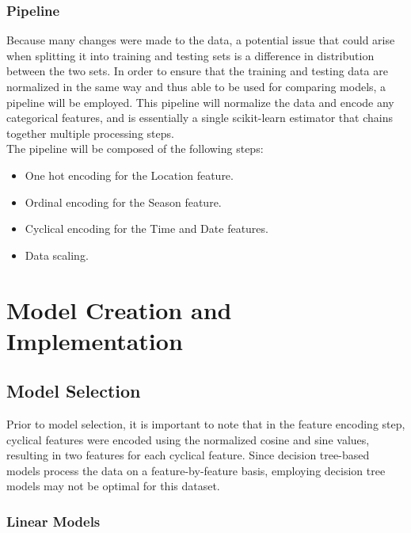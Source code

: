 \documentclass{report}
\begin{document}
\subsubsection{Pipeline}
Because many changes were made to the data, a potential issue that could arise when splitting it into training and testing sets is a difference in distribution between the two sets. In order to ensure that the training and testing data are normalized in the same way and thus able to be used for comparing models, a pipeline will be employed. This pipeline will normalize the data and encode any categorical features, and is essentially a single scikit-learn estimator that chains together multiple processing steps.\\
The pipeline will be composed of the following steps:
\begin{itemize}
    \item One hot encoding for the Location feature.
    \item Ordinal encoding for the Season feature.
    \item Cyclical encoding for the Time and Date features.
    \item Data scaling.
\end{itemize}

\section{Model Creation and Implementation}
\subsection{Model Selection}
Prior to model selection, it is important to note that in the feature encoding step, cyclical features were encoded using the normalized cosine and sine values, resulting in two features for each cyclical feature. Since decision tree-based models process the data on a feature-by-feature basis, employing decision tree models may not be optimal for this dataset.\cite{ce}
\subsubsection{Linear Models}
\end{document}
